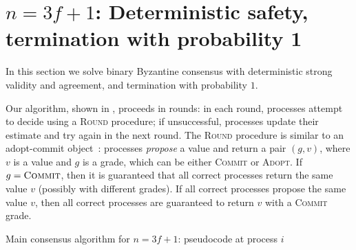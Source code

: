 \section{$n=3f+1$: Deterministic safety, termination with probability 1}
\label{sec:warmup}

In this section we solve binary Byzantine consensus with deterministic strong validity and agreement, and termination with probability $1$. 

Our algorithm, shown in , proceeds in rounds: in each round, processes attempt to decide using a \textsc{Round} procedure; if unsuccessful, processes update their estimate and try again in the next round. The \textsc{Round} procedure is similar to an adopt-commit object~\cite{ac1, ac2}: processes \textit{propose} a value and return a pair $(g,v)$, where $v$ is a value and $g$ is a grade, which can be either \textsc{Commit} or \textsc{Adopt}. If $g=\textsc{Commit}$, then it is guaranteed that all correct processes return the same value $v$ (possibly with different grades). If all correct processes propose the same value $v$, then all correct processes are guaranteed to return $v$ with a \textsc{Commit} grade.

\begin{algorithm}
\caption{Main consensus algorithm for $n=3f+1$: pseudocode at process $i$}
\label{alg:skeleton}
\end{algorithm}

